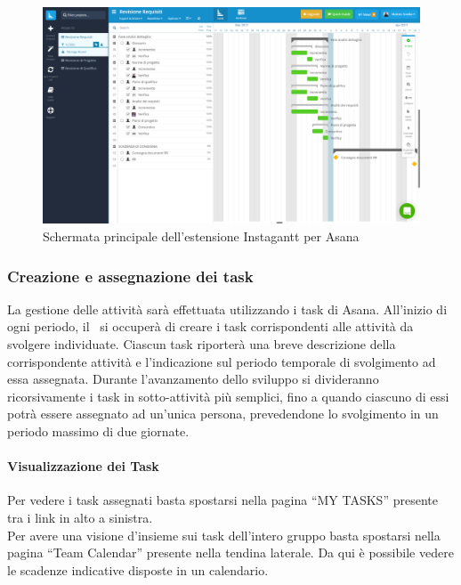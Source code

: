 \documentclass[../NormeDiProgetto.tex]{subfiles}
\begin{document}
			\begin{figure} [h!]
				\centering
				\includegraphics[scale=0.2]{./Immagini/Instagantt.png}
				\caption{Schermata principale dell'estensione Instagantt per Asana}\label{fig:InstExtAsana}
			\end{figure}
			
				\subsubsection{Creazione e assegnazione dei task}
				La gestione delle attività sarà effettuata utilizzando i task di Asana.
				All'inizio di ogni periodo, il \responsabilediprogetto\ si occuperà di creare i
				task corrispondenti alle attività da svolgere individuate. Ciascun task riporterà
				una breve descrizione della corrispondente attività e l'indicazione sul periodo temporale di
				svolgimento ad essa assegnata. Durante l'avanzamento dello sviluppo si divideranno
				ricorsivamente i task in sotto-attività più semplici, fino a quando ciascuno di essi potrà
				essere assegnato ad un'unica persona, prevedendone lo svolgimento in un periodo massimo di
				due giornate.
				\paragraph{Visualizzazione dei Task\\}
				Per vedere i task assegnati basta spostarsi nella pagina ``MY
				TASKS'' presente tra i link in alto a sinistra.\\
				Per avere una visione d'insieme sui task dell'intero gruppo basta
				spostarsi nella pagina ``Team Calendar'' presente nella tendina
				laterale. Da qui è possibile vedere le scadenze indicative disposte
				in un calendario.
				
				
\end{document}
